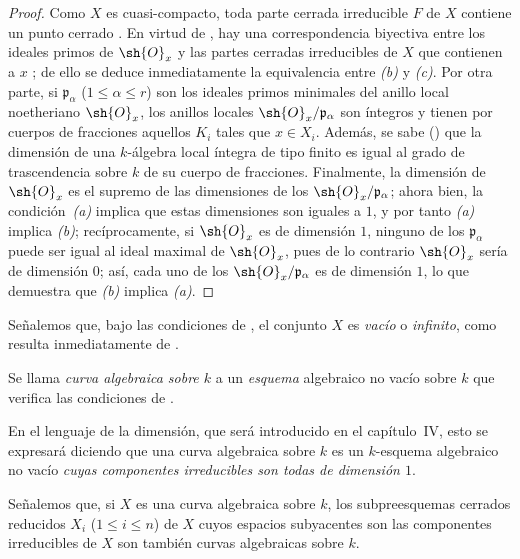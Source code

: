 \documentclass[oneside,10pt]{amsart}
\renewcommand{\leq}{\leqslant}
\let\EGAOriginalLabel\label
\renewcommand{\label}[1]{\phantomsection\EGAOriginalLabel{#1}}
\begin{document}
\begin{proof}
Como $X$ es cuasi-compacto, toda parte cerrada irreducible $F$ de $X$ contiene un punto cerrado .
En virtud de , hay una correspondencia biyectiva entre los ideales primos de $\sh{O}_x$ y las partes cerradas irreducibles de $X$ que contienen a $x$ ;
de ello se deduce inmediatamente la equivalencia entre \emph{(b)} y \emph{(c)}.
Por otra parte, si $\mathfrak{p}_\alpha$ ($1\leq\alpha\leq r$) son los ideales primos minimales del anillo local noetheriano $\sh{O}_x$, los anillos locales $\sh{O}_x/\mathfrak{p}_\alpha$ son íntegros y tienen por cuerpos de fracciones aquellos $K_i$ tales que $x\in X_i$.
Además, se sabe (\cite[p.~4-06, th.~2]{I-1}) que la dimensión de una $k$-álgebra local íntegra de tipo finito es igual al grado de trascendencia sobre $k$ de su cuerpo de fracciones.
Finalmente, la dimensión de $\sh{O}_x$ es el supremo de las dimensiones de los $\sh{O}_x/\mathfrak{p}_\alpha$;
ahora bien, la condición~\emph{(a)} implica que estas dimensiones son iguales a $1$, y por tanto \emph{(a)} implica \emph{(b)};
recíprocamente, si $\sh{O}_x$ es de dimensión $1$, ninguno de los $\mathfrak{p}_\alpha$ puede ser igual al ideal maximal de $\sh{O}_x$, pues de lo contrario $\sh{O}_x$ sería de dimensión $0$;
así, cada uno de los $\sh{O}_x/\mathfrak{p}_\alpha$ es de dimensión $1$, lo que demuestra que \emph{(b)} implica \emph{(a)}.
\end{proof}

Señalemos que, bajo las condiciones de , el conjunto $X$ es \emph{vacío} o \emph{infinito}, como resulta inmediatamente de .

\begin{definition}[7.4.2]
\label{II.7.4.2}
Se llama \emph{curva algebraica sobre $k$} a un \emph{esquema} algebraico no vacío sobre $k$ que verifica las condiciones de \textup{}.
\end{definition}

En el lenguaje de la dimensión, que será introducido en el capítulo~IV, esto se expresará diciendo que una curva algebraica sobre $k$ es un $k$-esquema algebraico no vacío \emph{cuyas componentes irreducibles son todas de dimensión $1$}.

Señalemos que, si $X$ es una curva algebraica sobre $k$, los subpreesquemas cerrados reducidos $X_i$ ($1\leq i\leq n$) de $X$ cuyos espacios subyacentes son las componentes irreducibles de $X$ son también curvas algebraicas sobre $k$.
\end{document}
